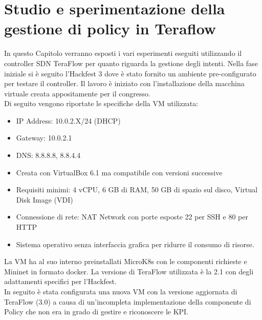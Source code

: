 \chapter{Studio e sperimentazione della gestione di policy in Teraflow}
\label{cap:policy}
In questo Capitolo verranno esposti i vari esperimenti eseguiti utilizzando il controller SDN TeraFlow per quanto riguarda la gestione degli intenti.
Nella fase iniziale si è seguito l'Hackfest 3 \cite{hackfest} dove è stato fornito un ambiente pre-configurato per testare il controller. 
Il lavoro è iniziato con l'installazione della macchina virtuale \cite{VM} creata appositamente per il congresso.
\\Di seguito vengono riportate le specifiche della VM utilizzata:
\begin{itemize}
    \item IP Address: 10.0.2.X/24 (DHCP)
    \item Gateway: 10.0.2.1
    \item DNS: 8.8.8.8, 8.8.4.4
    \item Creata con VirtualBox 6.1 ma compatibile con versioni successive
    \item Requisiti minimi: 4 vCPU, 6 GB di RAM, 50 GB di spazio sul disco, Virtual Disk Image (VDI)
    \item Connessione di rete: NAT Network con porte esposte 22 per SSH e 80 per HTTP
    \item Sistema operativo senza interfaccia grafica per ridurre il consumo di risorse.
\end{itemize}
La VM ha al suo interno preinstallati MicroK8s con le componenti richieste e Mininet in formato docker.
La versione di TeraFlow utilizzata è la 2.1 con degli adattamenti specifici per l'Hackfest.
\\In seguito è stata configurata una nuova VM con la versione aggiornata di TeraFlow (3.0) a causa di un'incompleta implementazione della componente di Policy che non era in grado di gestire e riconoscere le KPI.
